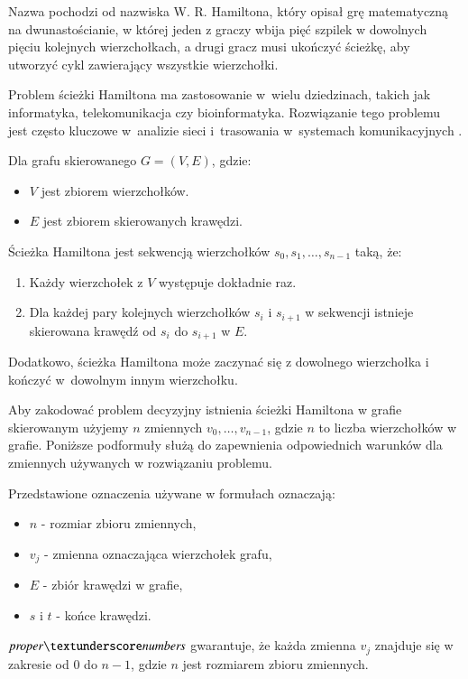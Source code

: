 Nazwa pochodzi od nazwiska W. R. Hamiltona, który opisał grę matematyczną na dwunastościanie, w której jeden z graczy wbija pięć szpilek w dowolnych pięciu kolejnych wierzchołkach, a drugi gracz musi ukończyć ścieżkę, aby utworzyć cykl zawierający wszystkie wierzchołki.

Problem ścieżki Hamiltona ma zastosowanie w~wielu dziedzinach, takich jak informatyka, telekomunikacja czy bioinformatyka. Rozwiązanie tego problemu jest często kluczowe w~analizie sieci i~trasowania w~systemach komunikacyjnych \cite{enwiki:1190136070}.

Dla grafu skierowanego $G = (V, E)$, gdzie:
\begin{itemize}
	\item \(V\) jest zbiorem wierzchołków.
	\item \(E\) jest zbiorem skierowanych krawędzi.
\end{itemize}
Ścieżka Hamiltona jest sekwencją wierzchołków $s_0, s_1, …, s_{n-1}$ taką, że:
\begin{enumerate}
	\item Każdy wierzchołek z \(V\) występuje dokładnie raz.
	\item Dla każdej pary kolejnych wierzchołków \(s_i\) i \(s_{i+1}\) w sekwencji istnieje skierowana krawędź od \(s_i\) do \(s_{i+1}\) w \(E\). 
\end{enumerate}

Dodatkowo, ścieżka Hamiltona może zaczynać się z dowolnego wierzchołka i kończyć w~dowolnym innym wierzchołku.

Aby zakodować problem decyzyjny istnienia ścieżki Hamiltona w grafie skierowanym użyjemy $n$ zmiennych $v_0,\ldots,v_{n-1}$, gdzie $n$ to liczba wierzchołków w grafie.
Poniższe podformuły służą do zapewnienia odpowiednich warunków dla zmiennych używanych w rozwiązaniu problemu.

Przedstawione oznaczenia używane w formułach oznaczają:
\begin{itemize}
	\item \(n\) - rozmiar zbioru zmiennych, 
	\item \(v_j\) - zmienna oznaczająca wierzchołek grafu,
	\item \(E\) - zbiór krawędzi w grafie,
	\item \(s\) i \(t\) - końce krawędzi.
\end{itemize}

$\propernumbers$ gwarantuje, że każda zmienna \(v_j\) znajduje się w zakresie od \(0\) do $n − 1$, gdzie \(n\) jest rozmiarem zbioru zmiennych.

